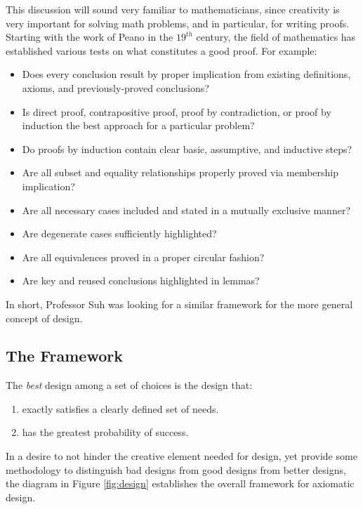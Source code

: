 This discussion will sound very familiar to mathematicians, since creativity is very important for solving math
problems, and in particular, for writing proofs.  Starting with the work of Peano in the \(19^{th}\) century, the
field of mathematics has established various tests on what constitutes a good proof.  For example:
\begin{itemize}
\item Does every conclusion result by proper implication from existing definitions, axioms, and previously-proved
  conclusions?
\item Is direct proof, contrapositive proof, proof by contradiction, or proof by induction the best approach for a
  particular problem?
\item Do proofs by induction contain clear basic, assumptive, and inductive steps?
\item Are all subset and equality relationships properly proved via membership implication?
\item Are all necessary cases included and stated in a mutually exclusive manner?
\item Are degenerate cases sufficiently highlighted?
\item Are all equivalences proved in a proper circular fashion?
\item Are key and reused conclusions highlighted in lemmas?
\end{itemize}
In short, Professor Suh was looking for a similar framework for the more general concept of design.

\subsection{The Framework}

The \emph{best} design among a set of choices is the design that:
\begin{enumerate}
\item exactly satisfies a clearly defined set of needs.
\item has the greatest probability of success.
\end{enumerate}

In a desire to not hinder the creative element needed for design, yet provide some methodology to distinguish bad
designs from good designs from better designs, the diagram in Figure \ref{fig:design} establishes the overall
framework for axiomatic design.

